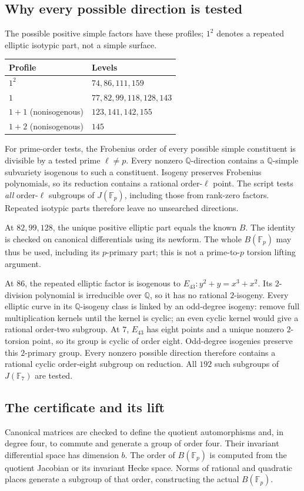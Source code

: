 \documentclass[11pt,a4paper]{article}
\newcommand{\Q}{\mathbb Q}
\newcommand{\F}{\mathbb F}
\begin{document}
\subsection{Why every possible direction is tested}
The possible positive simple factors have these profiles; $1^2$
denotes a repeated elliptic isotypic part, not a simple surface.
\begin{center}
\begin{tabular}{@{}ll@{}}
\toprule Profile&Levels\\
\midrule
$1^2$&$74,86,111,159$\\
$1$&$77,82,99,118,128,143$\\
$1+1$ (nonisogenous)&$123,141,142,155$\\
$1+2$ (nonisogenous)&$145$\\
\bottomrule
\end{tabular}
\end{center}
For prime-order tests, the Frobenius order of every possible simple
constituent is divisible by a tested prime $\ell\ne p$.
Every nonzero $\Q$-direction contains a $\Q$-simple subvariety isogenous
to such a constituent. Isogeny preserves Frobenius polynomials, so its
reduction contains a rational order-$\ell$ point.
The script tests \emph{all} order-$\ell$ subgroups of $J(\F_p)$,
including those from rank-zero factors. Repeated isotypic parts
therefore leave no unsearched directions.

At $82,99,128$, the unique positive elliptic part equals the known $B$.
The identity is checked on canonical differentials using its newform.
The whole $B(\F_p)$ may thus be used, including its $p$-primary part;
this is not a prime-to-$p$ torsion lifting argument.

At $86$, the repeated elliptic factor is isogenous to
$E_{43}:y^2+y=x^3+x^2$. Its $2$-division polynomial is irreducible
over $\Q$, so it has no rational $2$-isogeny.
Every elliptic curve in its $\Q$-isogeny class is linked by an odd-degree
isogeny: remove full multiplication kernels until the kernel is cyclic;
an even cyclic kernel would give a rational order-two subgroup.
At $7$, $E_{43}$ has eight points and a unique nonzero $2$-torsion
point, so its group is cyclic of order eight.
Odd-degree isogenies preserve this $2$-primary group.
Every nonzero possible direction therefore contains a rational cyclic
order-eight subgroup on reduction. All $192$ such subgroups of
$J(\F_7)$ are tested.

\subsection{The certificate and its lift}
Canonical matrices are checked to define the quotient automorphisms
and, in degree four, to commute and generate a group of order four.
Their invariant differential space has dimension $b$.
The order of $B(\F_p)$ is computed from the quotient Jacobian or its
invariant Hecke space. Norms of rational and quadratic places generate
a subgroup of that order, constructing the actual $B(\F_p)$.
\end{document}
